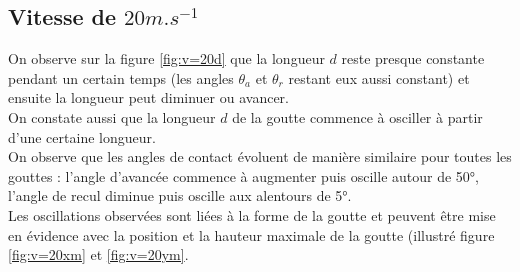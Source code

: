 \newpage
\subsection{Vitesse de $20m.s^{-1}$}

On observe sur la figure \ref{fig:v=20d} que la longueur $d$ reste presque constante pendant un certain temps (les angles $\theta_{a}$ et $\theta_{r}$ restant eux aussi constant) et ensuite la longueur peut diminuer ou avancer.\\

On constate aussi que la longueur $d$ de la goutte commence à osciller à partir d'une certaine longueur.\\

On observe que les angles de contact évoluent de manière similaire pour toutes les gouttes : l'angle d'avancée commence à augmenter puis oscille autour de \ang{50}, l'angle de recul diminue puis oscille aux alentours de \ang{5}.\\

Les oscillations observées sont liées à la forme de la goutte et peuvent être mise en évidence avec la position et la hauteur maximale de la goutte (illustré figure \ref{fig:v=20xm} et \ref{fig:v=20ym}.\\

